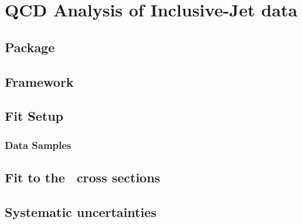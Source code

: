 \section{QCD Analysis of Inclusive-Jet data}
\label{sec:aspdffit}


\subsection{\herafitter Package}
\label{subsec:herfitter}


\subsection{\fastnlo Framework}
\label{subsec:fastnlo}


%

\subsection{Fit Setup}
\label{subsec:fitsettings}


\subsubsection{Data Samples}
\label{subsec:aspdffitdata}


\subsection{Fit to the \dsdetjetb~cross sections}
\label{subsec:doubledifasfit}



\subsection{Systematic uncertainties}
\label{subsec:assysunc}

